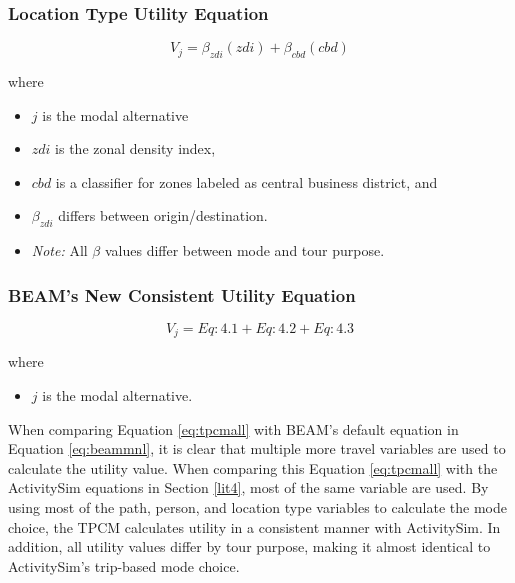 \documentclass[12pt, oneside, openright]{byuthesis}
\providecommand{\tightlist}{%
  \setlength{\itemsep}{0pt}\setlength{\parskip}{0pt}}
\begin{document}
\hypertarget{location-type-utility-equation}{%
\subsubsection{Location Type Utility Equation}\label{location-type-utility-equation}}

\begin{equation}
  V_j = \beta_{zdi}(zdi) + \beta_{cbd}(cbd) \label{eq:tpcmloc}
\end{equation}

where

\begin{itemize}
\tightlist
\item
  \(j\) is the modal alternative
\item
  \(zdi\) is the zonal density index,
\item
  \(cbd\) is a classifier for zones labeled as central business district, and
\item
  \(\beta_{zdi}\) differs between origin/destination.
\item
  \emph{Note:} All \(\beta\) values differ between mode and tour purpose.
\end{itemize}

\hypertarget{beams-new-consistent-utility-equation}{%
\subsubsection{BEAM's New Consistent Utility Equation}\label{beams-new-consistent-utility-equation}}

\begin{equation}  
  V_j = Eq:4.1 + Eq:4.2 + Eq:4.3 \label{eq:tpcmall}
\end{equation}

where

\begin{itemize}
\tightlist
\item
  \(j\) is the modal alternative.
\end{itemize}

When comparing Equation \eqref{eq:tpcmall} with BEAM's default equation in Equation \eqref{eq:beammnl}, it is clear that multiple more travel variables are used to calculate the utility value. When comparing this Equation \eqref{eq:tpcmall} with the ActivitySim equations in Section \ref{lit4}, most of the same variable are used. By using most of the path, person, and location type variables to calculate the mode choice, the TPCM calculates utility in a consistent manner with ActivitySim. In addition, all utility values differ by tour purpose, making it almost identical to ActivitySim's trip-based mode choice.
\end{document}
